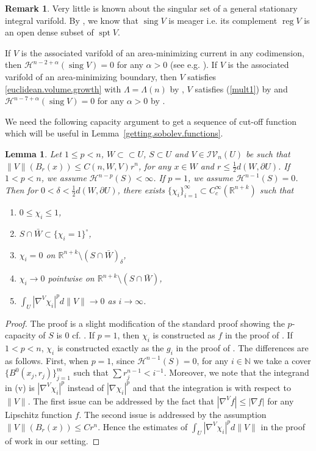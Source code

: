 \documentclass[11pt]{amsart}
\newtheorem{lemma}[theorem]{Lemma}
\theoremstyle{definition}
\newtheorem{remark}[theorem]{Remark}
\newcommand{\HH}{\mathcal{H}}
\newcommand{\R}{\mathbb{R}}
\newcommand{\N}{\mathbb{N}}
\newcommand{\IV}{\mathcal{IV}}
\newcommand{\ssubset}{\subset\subset}
\DeclareMathOperator{\spt}{spt}
\DeclareMathOperator{\sing}{sing}
\DeclareMathOperator{\reg}{reg}
\begin{document}
\begin{remark}\label{known.result.sing.v}
	Very little is known about the singular set of a general stationary integral varifold. By \cite[8.1(1)]{allard1972first}, we know that $\sing V$ is meager i.e. its complement $\reg V$ is an open dense subset of $\spt V$. 
	
	If $V$ is the associated varifold of an area-minimizing current in any codimension, then $\HH^{n-2+\alpha} (\sing V)=0$ for any $\alpha>0$ (see e.g. \cite[Theorem 3.4]{DeLellis2016}). If $V$ is the associated varifold of an area-minimizing boundary, then $V$  satisfies \eqref{euclidean.volume.growth} with $\Lambda=\Lambda(n)$ by \cite[Proof of 37.2 (1)]{Sim}, $V$ satisfies (\ref{mult1}) by \cite[Remark 37.1 (**)]{Sim} and $\HH^{n-7+\alpha} (\sing V)=0$ for any $\alpha>0$ by \cite{Fed70}.
\end{remark}
We need the following capacity argument to get a sequence of cut-off function which will be useful in Lemma~\ref{getting.sobolev.functions}.
\begin{lemma}\label{cutoff.function}
	Let $1\le p<n$, $W\ssubset U$, $S\subset U$ and $V\in \IV_n(U)$ be such that $\|V\|(B_r(x))\le C(n,W,V)r^n$, for any $x\in W$ and $r\le \frac{1}{2}d(W,\partial U)$. If $1<p<n$, we assume $\HH^{n-p}(S)<\infty$. If $p=1$, we assume $\HH^{n-1}(S)=0$. Then for $0<\delta<\frac{1}{2}d(W,\partial U)$, there exists $\{\chi_i\}_{i=1}^\infty\subset C_c^\infty(\R^{n+k})$ such that \begin{enumerate}
		\item [(i)] $0\le \chi_i\le 1$,
		\item[(ii)]$S\cap \bar W\subset \{\chi_i=1\}^\circ$,
		\item[(iii)]$\chi_i=0$ on $\R^{n+k}\setminus (S\cap \bar W)_\delta$,
		\item[(iv)] $\chi_i\to 0$ pointwise on $\R^{n+k}\setminus(S\cap \bar W)$,
		\item[(v)]$\int_U |\nabla^V \chi_i|^pd\|V\|\to0$ as $i\to\infty$.
	\end{enumerate}
\end{lemma}
\begin{proof}
	The proof is a slight modification of the standard proof showing the $p$-capacity of $S$ is 0 cf. \cite[Theorem 4.16]{gariepy2015measure}. If $p=1$, then $\chi_i$ is constructed as $f$ in the proof of \cite[Theorem 4.16]{gariepy2015measure}. If $1<p<n$, $\chi_i$ is constructed exactly as the $g_i$ in the proof of \cite[Theorem 4.16]{gariepy2015measure}. The differences are as follows. First, when $p=1$, since $\HH^{n-1}(S)=0$, for any $i\in\N$ we take a cover $\{B^0(x_j,r_j)\}_{j=1}^m$ such that $\sum r_j^{n-1}<i^{-1}$. Moreover, we note that the integrand in (v) is $|\nabla^V\chi_i|^p$ instead of $|\nabla \chi_i|^p$ and that the integration is with respect to $\|V\|$. The first issue can be addressed by the fact that $|\nabla ^Vf|\le |\nabla f|$ for any Lipschitz function $f$. The second issue is addressed by the assumption $\|V\|(B_r(x))\le Cr^n$. Hence the estimates of $\int_U |\nabla^V\chi_i|^pd\|V\|$ in the proof of \cite[Theorem 4.16]{gariepy2015measure} work in our setting.
\end{proof}
\end{document}
